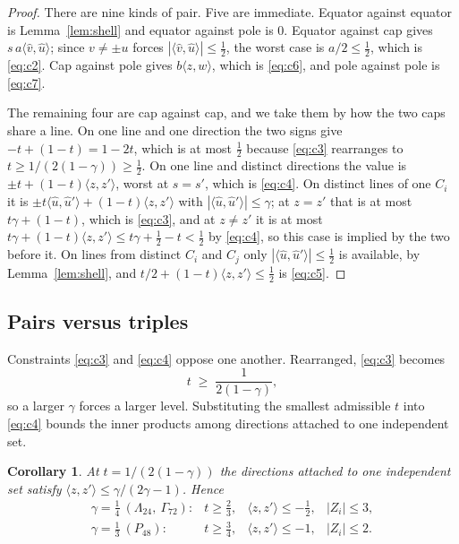 \documentclass[11pt]{amsart}
\newtheorem{corollary}[theorem]{Corollary}
\theoremstyle{remark}
\newcommand{\Leech}{\Lambda_{24}}
\newcommand{\Pff}{P_{48}}
\newcommand{\Gsz}{\Gamma_{72}}
\newcommand{\ip}[2]{\langle #1,#2\rangle}
\begin{document}
\begin{proof}
There are nine kinds of pair. Five are immediate. Equator against equator is
Lemma~\ref{lem:shell} and equator against pole is $0$. Equator against cap gives
$s\,a\ip{\hat v}{\hat u}$; since $v\ne\pm u$ forces
$|\ip{\hat v}{\hat u}|\le\tfrac12$, the worst case is $a/2\le\tfrac12$, which is
\eqref{eq:c2}. Cap against pole gives $b\ip{z}{w}$, which is \eqref{eq:c6}, and
pole against pole is \eqref{eq:c7}.

The remaining four are cap against cap, and we take them by how the two caps
share a line. On one line and one direction the two signs give
$-t+(1-t)=1-2t$, which is at most $\tfrac12$ because \eqref{eq:c3} rearranges to
$t\ge1/(2(1-\gamma))\ge\tfrac12$. On one line and distinct directions the value
is $\pm t+(1-t)\ip{z}{z'}$, worst at $s=s'$, which is \eqref{eq:c4}. On distinct
lines of one $C_i$ it is $\pm t\ip{\hat u}{\hat u'}+(1-t)\ip{z}{z'}$ with
$|\ip{\hat u}{\hat u'}|\le\gamma$; at $z=z'$ that is at most $t\gamma+(1-t)$,
which is \eqref{eq:c3}, and at $z\ne z'$ it is at most
$t\gamma+(1-t)\ip{z}{z'}\le t\gamma+\tfrac12-t<\tfrac12$ by \eqref{eq:c4}, so
this case is implied by the two before it. On lines from distinct $C_i$ and
$C_j$ only $|\ip{\hat u}{\hat u'}|\le\tfrac12$ is available, by
Lemma~\ref{lem:shell}, and $t/2+(1-t)\ip{z}{z'}\le\tfrac12$ is \eqref{eq:c5}.
\end{proof}

\subsection{Pairs versus triples}\label{ss:pairs}

Constraints \eqref{eq:c3} and \eqref{eq:c4} oppose one another. Rearranged,
\eqref{eq:c3} becomes
\begin{equation}\label{eq:tmin}
  t\;\ge\;\frac{1}{2(1-\gamma)},
\end{equation}
so a larger $\gamma$ forces a larger level. Substituting the smallest admissible
$t$ into \eqref{eq:c4} bounds the inner products among directions attached to one
independent set.

\begin{corollary}\label{cor:pairs}
At $t=1/(2(1-\gamma))$ the directions attached to one independent set satisfy
$\ip{z}{z'}\le\gamma/(2\gamma-1)$. Hence
\[
\begin{array}{llll}
  \gamma=\tfrac14 \ (\Leech,\ \Gsz): & t\ge\tfrac23, &
     \ip{z}{z'}\le-\tfrac12, & |Z_i|\le3,\\
  \gamma=\tfrac13 \ (\Pff): & t\ge\tfrac34, &
     \ip{z}{z'}\le-1, & |Z_i|\le2 .
\end{array}
\]
\end{corollary}
\end{document}
